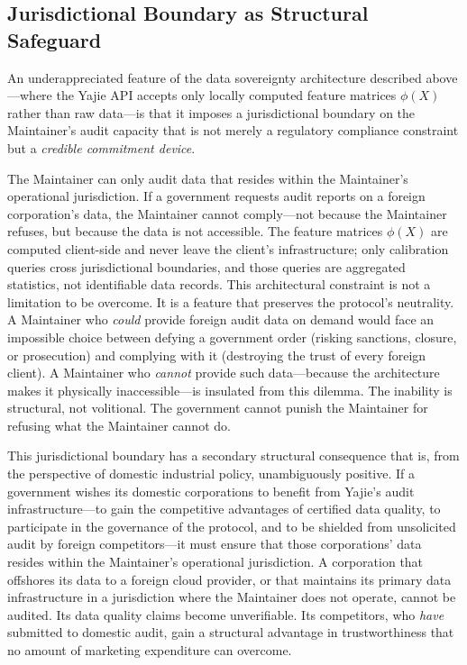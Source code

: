 \documentclass[12pt,a4paper]{article}
\theoremstyle{definition}
\theoremstyle{remark}
\begin{document}
\subsection{Jurisdictional Boundary as Structural Safeguard}

An underappreciated feature of the data sovereignty architecture described above—where the Yajie API accepts only locally computed feature matrices $\phi(X)$ rather than raw data—is that it imposes a jurisdictional boundary on the Maintainer's audit capacity that is not merely a regulatory compliance constraint but a \textit{credible commitment device}.

The Maintainer can only audit data that resides within the Maintainer's operational jurisdiction. If a government requests audit reports on a foreign corporation's data, the Maintainer cannot comply—not because the Maintainer refuses, but because the data is not accessible. The feature matrices $\phi(X)$ are computed client-side and never leave the client's infrastructure; only calibration queries cross jurisdictional boundaries, and those queries are aggregated statistics, not identifiable data records. This architectural constraint is not a limitation to be overcome. It is a feature that preserves the protocol's neutrality. A Maintainer who \textit{could} provide foreign audit data on demand would face an impossible choice between defying a government order (risking sanctions, closure, or prosecution) and complying with it (destroying the trust of every foreign client). A Maintainer who \textit{cannot} provide such data—because the architecture makes it physically inaccessible—is insulated from this dilemma. The inability is structural, not volitional. The government cannot punish the Maintainer for refusing what the Maintainer cannot do.

This jurisdictional boundary has a secondary structural consequence that is, from the perspective of domestic industrial policy, unambiguously positive. If a government wishes its domestic corporations to benefit from Yajie's audit infrastructure—to gain the competitive advantages of certified data quality, to participate in the governance of the protocol, and to be shielded from unsolicited audit by foreign competitors—it must ensure that those corporations' data resides within the Maintainer's operational jurisdiction. A corporation that offshores its data to a foreign cloud provider, or that maintains its primary data infrastructure in a jurisdiction where the Maintainer does not operate, cannot be audited. Its data quality claims become unverifiable. Its competitors, who \textit{have} submitted to domestic audit, gain a structural advantage in trustworthiness that no amount of marketing expenditure can overcome.
\end{document}
